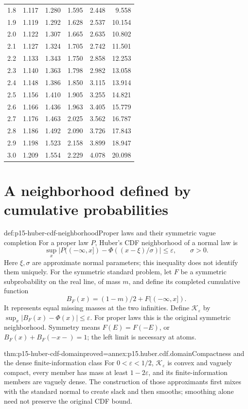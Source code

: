 \begin{center}
\begin{longtable}{rrrrrr}
1.8&1.117&1.280&1.595&2.448&9.558\\
1.9&1.119&1.292&1.628&2.537&10.154\\
2.0&1.122&1.307&1.665&2.635&10.802\\
2.1&1.127&1.324&1.705&2.742&11.501\\
2.2&1.133&1.343&1.750&2.858&12.253\\
2.3&1.140&1.363&1.798&2.982&13.058\\
2.4&1.148&1.386&1.850&3.115&13.914\\
2.5&1.156&1.410&1.905&3.255&14.821\\
2.6&1.166&1.436&1.963&3.405&15.779\\
2.7&1.176&1.463&2.025&3.562&16.787\\
2.8&1.186&1.492&2.090&3.726&17.843\\
2.9&1.198&1.523&2.158&3.899&18.947\\
3.0&1.209&1.554&2.229&4.078&20.098\\
\end{longtable}
\end{center}

\section{A neighborhood defined by cumulative probabilities}
\label{sec:p15-huber-cdf-neighborhood}

\begin{hbdefinition}{def:p15-huber-cdf-neighborhood}{Proper laws and their symmetric vague completion}
For a proper law \(P\), Huber's CDF neighborhood of a normal law is
\[
 \sup_x|P((-\infty,x])-\Phi((x-\xi)/\sigma)|\leq\varepsilon,
 \qquad \sigma>0.
\]
Here \(\xi,\sigma\) are approximate normal parameters; this inequality
does not identify them uniquely. For the symmetric standard problem,
let \(F\) be a symmetric subprobability on the real line, of mass \(m\),
and define its completed cumulative function
\[
 B_F(x)=(1-m)/2+F((-\infty,x]).
\]
It represents equal missing masses at the two infinities.
Define \(\mathcal K_\varepsilon\) by
\(\sup_x|B_F(x)-\Phi(x)|\leq\varepsilon\).
For proper laws this is the original symmetric neighborhood.
Symmetry means \(F(E)=F(-E)\), or
\(B_F(x)+B_F(-x-)=1\); the left limit is necessary at atoms.
\end{hbdefinition}

\begin{hbtheorem}{thm:p15-huber-cdf-domain}{proved=annex:p15.huber.cdf.domain}{Compactness and the dense finite-information class}
For \(0<\varepsilon<1/2\), \(\mathcal K_\varepsilon\) is convex
and vaguely compact, every member has mass at least \(1-2\varepsilon\),
and its finite-information members are vaguely dense.
The construction of those approximants first mixes with the
standard normal to create slack and then smooths; smoothing alone
need not preserve the original CDF bound.
\end{hbtheorem}

